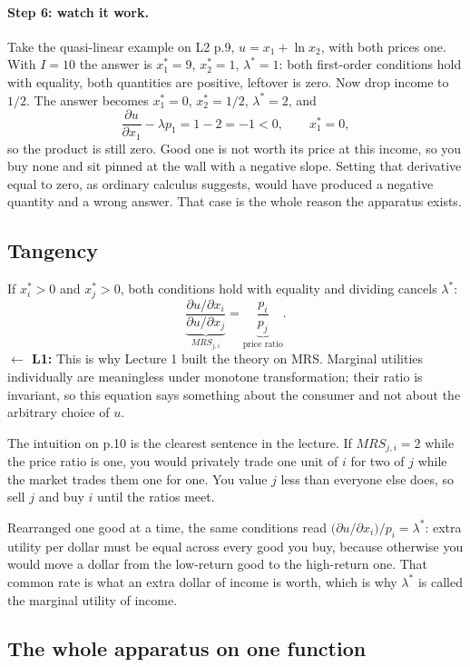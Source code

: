 \documentclass[11pt]{article}
\theoremstyle{definition}
\newcommand{\pdd}[2]{\frac{\partial #1}{\partial #2}}
\newcommand{\back}[1]{\textbf{\small $\leftarrow$ L1:} \small #1}
\begin{document}
\paragraph{Step 6: watch it work.} Take the quasi-linear example on L2 p.9,
$u=x_1+\ln x_2$, with both prices one. With $I=10$ the answer is $x_1^*=9$, $x_2^*=1$,
$\lambda^*=1$: both first-order conditions hold with equality, both quantities are positive,
leftover is zero. Now drop income to $1/2$. The answer becomes $x_1^*=0$, $x_2^*=1/2$,
$\lambda^*=2$, and
\[
\pdd{u}{x_1}-\lambda p_1 = 1-2 = -1<0,\qquad x_1^*=0,
\]
so the product is still zero. Good one is not worth its price at this income, so you buy
none and sit pinned at the wall with a negative slope. Setting that derivative equal to
zero, as ordinary calculus suggests, would have produced a negative quantity and a wrong
answer. That case is the whole reason the apparatus exists.

\subsection{Tangency}

If $x_i^*>0$ and $x_j^*>0$, both conditions hold with equality and dividing cancels
$\lambda^*$:
\[
\underbrace{\frac{\partial u/\partial x_i}{\partial u/\partial x_j}}_{MRS_{j,i}}
=\underbrace{\frac{p_i}{p_j}}_{\text{price ratio}}.
\]
\back{This is why Lecture 1 built the theory on MRS. Marginal utilities individually are
meaningless under monotone transformation; their ratio is invariant, so this equation says
something about the consumer and not about the arbitrary choice of $u$.}

The intuition on p.10 is the clearest sentence in the lecture. If $MRS_{j,i}=2$ while the
price ratio is one, you would privately trade one unit of $i$ for two of $j$ while the
market trades them one for one. You value $j$ less than everyone else does, so sell $j$ and
buy $i$ until the ratios meet.

Rearranged one good at a time, the same conditions read
$\big(\partial u/\partial x_i\big)/p_i=\lambda^*$: extra utility per dollar must be equal
across every good you buy, because otherwise you would move a dollar from the low-return
good to the high-return one. That common rate is what an extra dollar of income is worth,
which is why $\lambda^*$ is called the marginal utility of income.

\subsection{The whole apparatus on one function}
\end{document}
